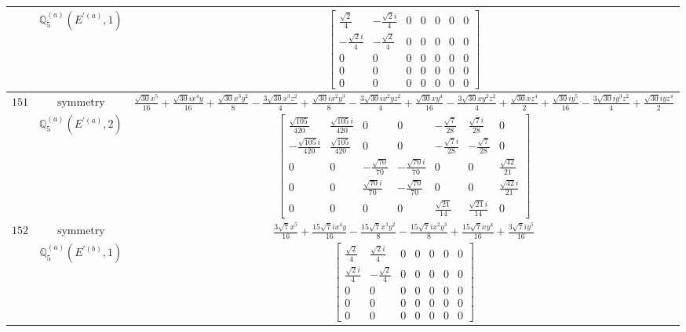 \documentclass[fleqn,8pt,landscape]{jsarticle}
\begin{document}
\begin{longtable}{ccc}
$  $ & $ \mathbb{Q}_{5}^{(a)}(E^{\prime(a)},1) $ & $ \begin{bmatrix} \frac{\sqrt{2}}{4} & - \frac{\sqrt{2} i}{4} & 0 & 0 & 0 & 0 & 0 \\ - \frac{\sqrt{2} i}{4} & - \frac{\sqrt{2}}{4} & 0 & 0 & 0 & 0 & 0 \\ 0 & 0 & 0 & 0 & 0 & 0 & 0 \\ 0 & 0 & 0 & 0 & 0 & 0 & 0 \\ 0 & 0 & 0 & 0 & 0 & 0 & 0 \end{bmatrix} $ \\ \hline
$ 151 $ & $ \text{symmetry} $ & $ \frac{\sqrt{30} x^{5}}{16} + \frac{\sqrt{30} i x^{4} y}{16} + \frac{\sqrt{30} x^{3} y^{2}}{8} - \frac{3 \sqrt{30} x^{3} z^{2}}{4} + \frac{\sqrt{30} i x^{2} y^{3}}{8} - \frac{3 \sqrt{30} i x^{2} y z^{2}}{4} + \frac{\sqrt{30} x y^{4}}{16} - \frac{3 \sqrt{30} x y^{2} z^{2}}{4} + \frac{\sqrt{30} x z^{4}}{2} + \frac{\sqrt{30} i y^{5}}{16} - \frac{3 \sqrt{30} i y^{3} z^{2}}{4} + \frac{\sqrt{30} i y z^{4}}{2} $ \\
$  $ & $ \mathbb{Q}_{5}^{(a)}(E^{\prime(a)},2) $ & $ \begin{bmatrix} \frac{\sqrt{105}}{420} & \frac{\sqrt{105} i}{420} & 0 & 0 & - \frac{\sqrt{7}}{28} & \frac{\sqrt{7} i}{28} & 0 \\ - \frac{\sqrt{105} i}{420} & \frac{\sqrt{105}}{420} & 0 & 0 & - \frac{\sqrt{7} i}{28} & - \frac{\sqrt{7}}{28} & 0 \\ 0 & 0 & - \frac{\sqrt{70}}{70} & - \frac{\sqrt{70} i}{70} & 0 & 0 & \frac{\sqrt{42}}{21} \\ 0 & 0 & \frac{\sqrt{70} i}{70} & - \frac{\sqrt{70}}{70} & 0 & 0 & \frac{\sqrt{42} i}{21} \\ 0 & 0 & 0 & 0 & \frac{\sqrt{21}}{14} & \frac{\sqrt{21} i}{14} & 0 \end{bmatrix} $ \\ \hline
$ 152 $ & $ \text{symmetry} $ & $ \frac{3 \sqrt{7} x^{5}}{16} + \frac{15 \sqrt{7} i x^{4} y}{16} - \frac{15 \sqrt{7} x^{3} y^{2}}{8} - \frac{15 \sqrt{7} i x^{2} y^{3}}{8} + \frac{15 \sqrt{7} x y^{4}}{16} + \frac{3 \sqrt{7} i y^{5}}{16} $ \\
$  $ & $ \mathbb{Q}_{5}^{(a)}(E^{\prime(b)},1) $ & $ \begin{bmatrix} \frac{\sqrt{2}}{4} & \frac{\sqrt{2} i}{4} & 0 & 0 & 0 & 0 & 0 \\ \frac{\sqrt{2} i}{4} & - \frac{\sqrt{2}}{4} & 0 & 0 & 0 & 0 & 0 \\ 0 & 0 & 0 & 0 & 0 & 0 & 0 \\ 0 & 0 & 0 & 0 & 0 & 0 & 0 \\ 0 & 0 & 0 & 0 & 0 & 0 & 0 \end{bmatrix} $ \\ \hline

\end{longtable}
\end{document}
